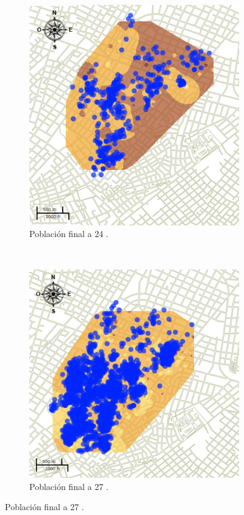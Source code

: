 \begin{figure}[!t]
    \begin{subfigure}[b]{0.225\textwidth}
        \includegraphics[width=\textwidth]{./graphics/temp-24-final.png}
        \caption{ Población final a 24 \textcelsius.}
    \end{subfigure}
    ~~~~
    \begin{subfigure}[b]{0.225\textwidth}
        \includegraphics[width=\textwidth]{./graphics/temp-27-final.png}
        \caption{ Población final a 27 \textcelsius.}
    \end{subfigure}


\end{figure}
